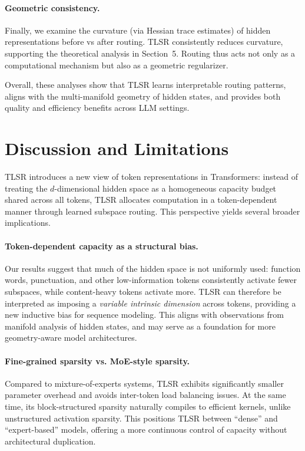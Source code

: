 \documentclass{article}
\theoremstyle{plain}
\theoremstyle{definition}
\theoremstyle{remark}
\begin{document}
\paragraph{Geometric consistency.}
Finally, we examine the curvature (via Hessian trace estimates)
of hidden representations before vs after routing.
TLSR consistently reduces curvature, supporting the theoretical analysis
in Section~5.  
Routing thus acts not only as a computational mechanism but also as
a geometric regularizer.

Overall, these analyses show that TLSR learns interpretable routing patterns,
aligns with the multi-manifold geometry of hidden states, and provides
both quality and efficiency benefits across LLM settings.

\section{Discussion and Limitations}

TLSR introduces a new view of token representations in Transformers:  
instead of treating the $d$-dimensional hidden space as a homogeneous
capacity budget shared across all tokens, TLSR allocates computation in a
token-dependent manner through learned subspace routing.  
This perspective yields several broader implications.

\paragraph{Token-dependent capacity as a structural bias.}
Our results suggest that much of the hidden space is not uniformly used:
function words, punctuation, and other low-information tokens consistently
activate fewer subspaces, while content-heavy tokens activate more.
TLSR can therefore be interpreted as imposing a
\emph{variable intrinsic dimension} across tokens, providing a new inductive bias
for sequence modeling.
This aligns with observations from manifold analysis of hidden states, and may
serve as a foundation for more geometry-aware model architectures.

\paragraph{Fine-grained sparsity vs. MoE-style sparsity.}
Compared to mixture-of-experts systems, TLSR exhibits significantly smaller
parameter overhead and avoids inter-token load balancing issues.
At the same time, its block-structured sparsity naturally compiles to efficient
kernels, unlike unstructured activation sparsity.
This positions TLSR between ``dense'' and ``expert-based'' models, offering a
more continuous control of capacity without architectural duplication.
\end{document}

